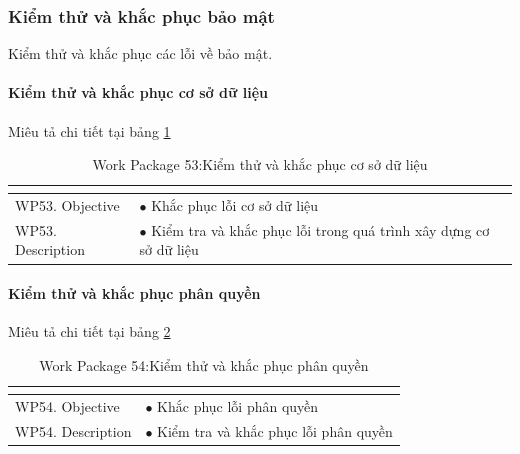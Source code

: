 \documentclass[a4paper]{book}
\begin{document}
\subsubsection{Kiểm thử và khắc phục bảo mật} Kiểm thử và khắc phục các lỗi về bảo mật.
\paragraph{Kiểm thử và khắc phục cơ sở dữ liệu} Miêu tả chi tiết tại bảng \ref{table:kt_kp_csdl}
\begin{table}[h!]
	\begin{center}
		\begin{tabular}{|p{4cm}|p{10cm}|}
			\hline
			\multicolumn{2}{|c|}{\cellcolor[HTML]{363636}{\color[HTML]{FFFFFF}Work package 53: Kiểm thử và khắc phục cơ sở dữ liệu}}\\
			\hline
			\multirow{1}{*}{WP53. Objective} & $\bullet$ Khắc phục lỗi cơ sở dữ liệu\\
			\hline
			\multirow{1}{*}{WP53. Description} & $\bullet$ Kiểm tra và khắc phục lỗi trong quá trình xây dựng cơ sở dữ liệu \\
			\hline
		\end{tabular}
		\caption{Work Package 53:Kiểm thử và khắc phục cơ sở dữ liệu}
		\label{table:kt_kp_csdl}
	\end{center}
\end{table}
\paragraph{Kiểm thử và khắc phục phân quyền} Miêu tả chi tiết tại bảng \ref{table:kt_kp_phanquyen}
\begin{table}[h!]
	\begin{center}
		\begin{tabular}{|p{4cm}|p{10cm}|}
			\hline
			\multicolumn{2}{|c|}{\cellcolor[HTML]{363636}{\color[HTML]{FFFFFF}Work package 54: Kiểm thử và khắc phục phân quyền}}\\
			\hline
			\multirow{1}{*}{WP54. Objective} & $\bullet$ Khắc phục lỗi phân quyền\\
			\hline
			\multirow{1}{*}{WP54. Description} & $\bullet$ Kiểm tra và khắc phục lỗi phân quyền \\
			\hline
		\end{tabular}
		\caption{Work Package 54:Kiểm thử và khắc phục phân quyền}
		\label{table:kt_kp_phanquyen}
	\end{center}
\end{table}
\end{document}
